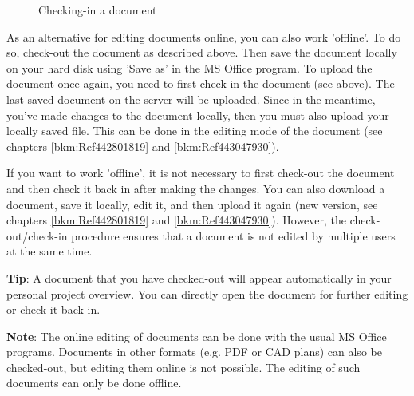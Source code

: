 \begin{figure}[H]
\caption{Checking-in a document}
\end{figure}

As an alternative for editing documents online, you can also work 'offline'. To do so, check-out the document as described above. Then save the document locally on your hard disk using 'Save as' in the MS Office program. To upload the document once again, you need to first check-in the document (see above). The last saved document on the server will be uploaded. Since in the meantime, you've made changes to the document locally, then you must also upload your locally saved file. This can be done in the editing mode of the document (see chapters \ref{bkm:Ref442801819} and \ref{bkm:Ref443047930}). \newline

If you want to work 'offline', it is not necessary to first check-out the document and then check it back in after making the changes. You can also download a document, save it locally, edit it, and then upload it again (new version, see chapters \ref{bkm:Ref442801819} and \ref{bkm:Ref443047930}). However, the check-out/check-in procedure ensures that a document is not edited by multiple users at the same time.

\vspace{\baselineskip}

\textbf{Tip}: A document that you have checked-out will appear automatically in your personal project overview. You can directly open the document for further editing or check it back in. \newline


\textbf{Note}: The online editing of documents can be done with the usual MS Office programs. Documents in other formats (e.g. PDF or CAD plans) can also be checked-out, but editing them online is not possible. The editing of such documents can only be done offline. \newline

